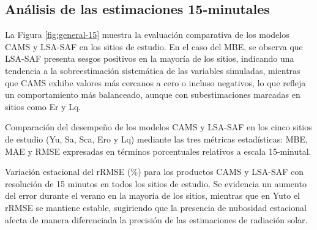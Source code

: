 \documentclass[letterpaper,12pt, twoside]{report}
\providecommand{\DIFdeltex}[1]{{\protect\color{red} \scriptsize #1}} %
\providecommand{\DIFdelFL}[1]{\DIFdel{#1}} %
\providecommand{\DIFdel}[1]{\texorpdfstring{\DIFdeltex{#1}}{}} %
\begin{document}
\subsection{\DIFdel{Análisis de las estimaciones 15-minutales}}
\addtocounter{subsection}{-1}%

\DIFdel{La Figura \ref{fig:general-15} muestra la evaluación comparativa de los modelos CAMS y LSA-SAF en los sitios de estudio. En el caso del MBE, se observa que LSA-SAF presenta sesgos positivos en la mayoría de los sitios, indicando una tendencia a la sobreestimación sistemática de las variables simuladas, mientras que CAMS exhibe valores más cercanos a cero o incluso negativos, lo que refleja un comportamiento más balanceado, aunque con subestimaciones marcadas en sitios como Er y Lq.
}%

{%
\DIFdelFL{Comparación del desempeño de los modelos CAMS y LSA-SAF en los cinco sitios de estudio (Yu, Sa, Sca, Ero y Lq) mediante las tres métricas estadísticas: MBE, MAE y RMSE expresadas en términos porcentuales relativos a escala 15-minutal.}}

{%
\DIFdelFL{Variación estacional del rRMSE (\%) para los productos CAMS y LSA-SAF con resolución de 15 minutos en todos los sitios de estudio. Se evidencia un aumento del error durante el verano en la mayoría de los sitios, mientras que en Yuto el rRMSE se mantiene estable, sugiriendo que la presencia de nubosidad estacional afecta de manera diferenciada la precisión de las estimaciones de radiación solar.}} 
\end{document}
